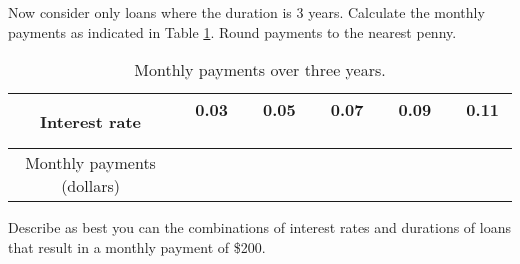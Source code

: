 \begin{pa}
    \item Now consider only loans where the duration is 3 years. Calculate the monthly payments as indicated in Table \ref{T:9.1.Payments_2}. Round payments to the nearest penny.
    \begin{table}[ht]
    \begin{center}
    \renewcommand{\arraystretch}{1.5}
    \begin{tabular}{|c|c|c|c|c|c|} \hline
    Interest rate  &\ 0.03 \    & \ 0.05 \     & \ 0.07 \     & \ 0.09 \    & \ 0.11 \  \\ \hline
    Monthly payments (dollars)    & \hspace*{0.55in} & \hspace*{0.55in} & \hspace*{0.55in} & \hspace*{0.55in} & \hspace*{0.55in}\\ \hline
    \end{tabular}
    \caption{Monthly payments over three years.}
    \label{T:9.1.Payments_2}
    \end{center}
    \end{table}

    \item Describe as best you can the combinations of interest rates and durations of loans that result in a monthly payment of \$200.


    \ea
\end{pa} 

